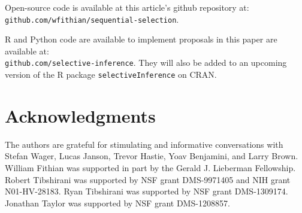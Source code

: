 \documentclass{article}
\begin{document}
Open-source code is available at this article's github repository at:\\ \texttt{github.com/wfithian/sequential-selection}.

R and Python code are available to implement proposals in this paper are available at:\\ \texttt{github.com/selective-inference}.
They will also be added to an upcoming version of the  R package  \texttt{selectiveInference} on CRAN.

\section*{Acknowledgments}

The authors are grateful for stimulating and informative conversations with Stefan Wager, Lucas Janson, Trevor Hastie, Yoav Benjamini, and Larry Brown. William Fithian was supported in part by the Gerald J. Lieberman Fellowship. Robert Tibshirani was supported by NSF grant DMS-9971405 and NIH grant N01-HV-28183. Ryan Tibshirani was supported by NSF grant DMS-1309174. Jonathan Taylor was supported by NSF grant DMS-1208857.




\newpage
\end{document}
